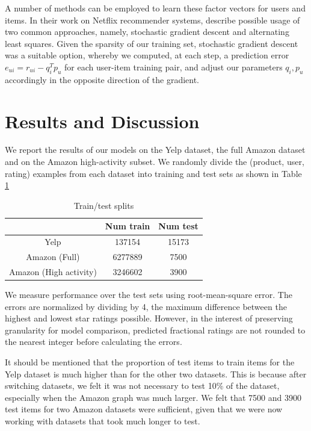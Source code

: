 \documentclass[letterpaper, 11 pt, conference]{ieeeconf}
\begin{document}
A number of methods can be employed to learn these factor vectors for
users and items. In their work on Netflix recommender systems,
\cite{bib:bellkor} describe possible usage of two common approaches, namely,
stochastic gradient descent and alternating least squares. Given the
sparsity of our training set, stochastic gradient descent was a suitable
option, whereby we computed, at each step, a prediction error $e_{ui}
=r_{ui}-q_i^Tp_u$ for each user-item training pair, and adjust our
parameters $q_i,p_u$ accordingly in the opposite direction of the gradient.


\section{Results and Discussion}
\label{sec:results}

We report the results of our models on the Yelp dataset, the full Amazon
dataset and on the Amazon high-activity subset. We randomly divide the 
(product, user, rating) examples from each dataset into training and test 
sets as shown in Table \ref{table:traintest}

\begin{table}[htb]
\centering
\begin{tabular}{|c|c|c|}
\cline{2-3}

\multicolumn{1}{c|}{}  & {Num train}  & {Num test} \tabularnewline \hline
Yelp & 137154 & 15173 \tabularnewline
Amazon (Full) & 6277889 & 7500 \tabularnewline
Amazon (High activity) & 3246602 & 3900 \tabularnewline
\hline
\end{tabular}
\caption{Train/test splits}
\label{table:traintest}
\end{table}

We measure performance over the test sets using 
root-mean-square error. The errors are normalized by dividing by 4, the maximum 
difference between the highest and lowest star ratings possible. However, 
in the interest of preserving granularity for model comparison, predicted
fractional ratings are not rounded to the nearest integer before calculating 
the errors. 

It should be mentioned that the proportion of test items to train items for 
the Yelp dataset is much higher than for the other two datasets. This is 
because after switching datasets, we felt it was not necessary to test 10\% of 
the dataset, especially when the Amazon graph was much larger. We felt that 
7500 and 3900 test items for two Amazon datasets were sufficient, given that we 
were now working with datasets that took much longer to test. 
\end{document}
